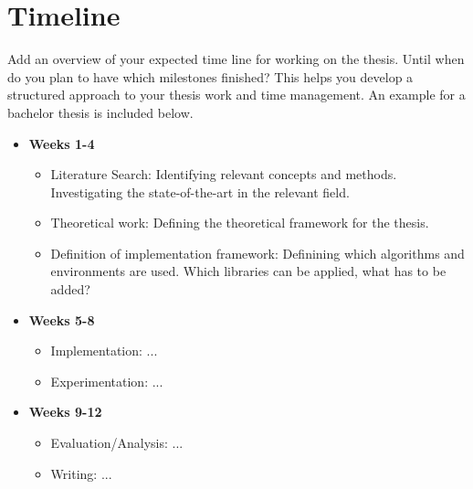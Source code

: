\section*{Timeline}

Add an overview of your expected time line for working on the thesis. Until when do you plan to have which milestones finished? This helps you develop a structured approach to your thesis work and time management. An example for a bachelor thesis is included below.

\begin{itemize}
    \item \textbf{Weeks 1-4}
    \begin{itemize}
        \item Literature Search: Identifying relevant concepts and methods. Investigating the state-of-the-art in the relevant field.
        \item Theoretical work: Defining the theoretical framework for the thesis.
        \item Definition of implementation framework: Definining which algorithms and environments are used. Which libraries can be applied, what has to be added?
    \end{itemize}
    \item \textbf{Weeks 5-8}
    \begin{itemize}
        \item Implementation: ...
        \item Experimentation: ...
    \end{itemize}
    \item \textbf{Weeks 9-12}
    \begin{itemize}
        \item Evaluation/Analysis: ...
        \item Writing: ...
    \end{itemize}
\end{itemize}